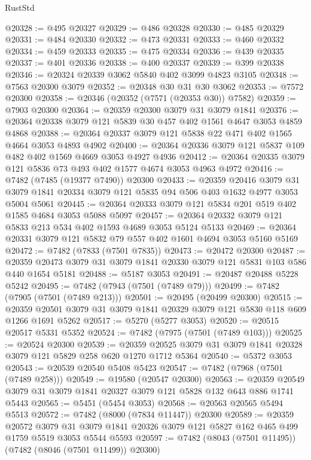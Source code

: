 \begin{lexlean}{RustStd}
\begin{coremodule}
@20328 := @495 @20327
@20329 := @486 @20328
@20330 := @485 @20329
@20331 := @484 @20330
@20332 := @473 @20331
@20333 := @460 @20332
@20334 := @459 @20333
@20335 := @475 @20334
@20336 := @439 @20335
@20337 := @401 @20336
@20338 := @400 @20337
@20339 := @399 @20338
@20346 := @20324 @20339 @3062 @5840 @402 @3099 @4823 @3105
@20348 := @7563 @20300 @3079
@20352 := @20348 @30 @31 @30 @3062
@20353 := @7572 @20300
@20358 := @20346 (@20352 (@7571 (@20353 @30)) @7582)
@20359 := @7903 @20300
@20364 := @20359 @20300 @3079 @31 @3079 @1841
@20376 := @20364 @20338 @3079 @121 @5839 @30 @457 @402 @1561 @4647 @3053 @4859 @4868
@20388 := @20364 @20337 @3079 @121 @5838 @22 @471 @402 @1565 @4664 @3053 @4893 @4902
@20400 := @20364 @20336 @3079 @121 @5837 @109 @482 @402 @1569 @4669 @3053 @4927 @4936
@20412 := @20364 @20335 @3079 @121 @5836 @73 @493 @402 @1577 @4674 @3053 @4963 @4972
@20416 := @7482 (@7485 (@19377 @7490)) @20300
@20433 := @20359
    @20416
    @3079
    @31
    @3079
    @1841
    @20334
    @3079
    @121
    @5835
    @94
    @506
    @403
    @1632
    @4977
    @3053
    @5004
    @5061
@20445 := @20364 @20333 @3079 @121 @5834 @201 @519 @402 @1585 @4684 @3053 @5088 @5097
@20457 := @20364 @20332 @3079 @121 @5833 @213 @534 @402 @1593 @4689 @3053 @5124 @5133
@20469 := @20364 @20331 @3079 @121 @5832 @79 @557 @402 @1601 @4694 @3053 @5160 @5169
@20472 := @7482 (@7833 (@7501 @7835))
@20473 := @20472 @20300
@20487 := @20359 @20473 @3079 @31 @3079 @1841 @20330 @3079 @121 @5831 @103 @586 @440 @1654 @5181
@20488 := @5187 @3053
@20491 := @20487 @20488 @5228 @5242
@20495 := @7482 (@7943 (@7501 (@7489 @79)))
@20499 := @7482 (@7905 (@7501 (@7489 @213)))
@20501 := @20495 (@20499 @20300)
@20515 := @20359 @20501 @3079 @31 @3079 @1841 @20329 @3079 @121 @5830 @118 @609 @1266 @1691 @5262
@20517 := @5270 (@5277 @3053)
@20520 := @20515 @20517 @5331 @5352
@20524 := @7482 (@7975 (@7501 (@7489 @103)))
@20525 := @20524 @20300
@20539 := @20359 @20525 @3079 @31 @3079 @1841 @20328 @3079 @121 @5829 @258 @620 @1270 @1712 @5364
@20540 := @5372 @3053
@20543 := @20539 @20540 @5408 @5423
@20547 := @7482 (@7968 (@7501 (@7489 @258)))
@20549 := @19580 (@20547 @20300)
@20563 := @20359 @20549 @3079 @31 @3079 @1841 @20327 @3079 @121 @5828 @132 @643 @886 @1741 @5443
@20565 := @5451 (@5454 @3053)
@20568 := @20563 @20565 @5494 @5513
@20572 := @7482 (@8000 (@7834 @11447)) @20300
@20589 := @20359
    @20572
    @3079
    @31
    @3079
    @1841
    @20326
    @3079
    @121
    @5827
    @162
    @465
    @499
    @1759
    @5519
    @3053
    @5544
    @5593
@20597 := @7482 (@8043 (@7501 @11495)) (@7482 (@8046 (@7501 @11499)) @20300)

\end{coremodule}
\end{lexlean}
